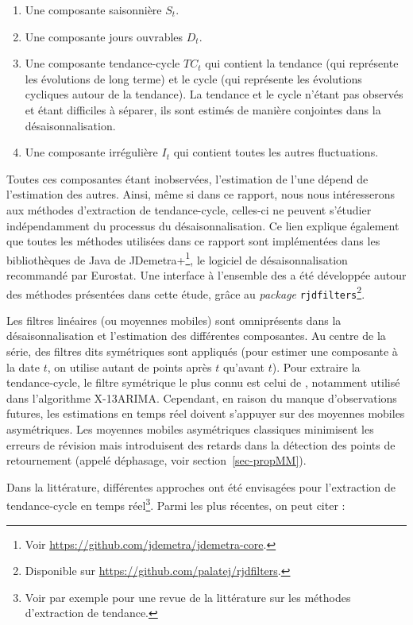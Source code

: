 \documentclass[
  12pt,
  french,
  12pt,a4paper]{article}
\newcommand\1{\mathds{1}}
\begin{document}
\begin{enumerate}
\def\labelenumi{\arabic{enumi}.}
\item
  Une composante saisonnière \(S_t\).
\item
  Une composante jours ouvrables \(D_t\).
\item
  Une composante tendance-cycle \(TC_t\) qui contient la tendance (qui représente les évolutions de long terme) et le cycle (qui représente les évolutions cycliques autour de la tendance).
  La tendance et le cycle n'étant pas observés et étant difficiles à séparer, ils sont estimés de manière conjointes dans la désaisonnalisation.
\item
  Une composante irrégulière \(I_t\) qui contient toutes les autres fluctuations.
\end{enumerate}

Toutes ces composantes étant inobservées, l'estimation de l'une dépend de l'estimation des autres.
Ainsi, même si dans ce rapport, nous nous intéresserons aux méthodes d'extraction de tendance-cycle, celles-ci ne peuvent s'étudier indépendamment du processus du désaisonnalisation.
Ce lien explique également que toutes les méthodes utilisées dans ce rapport sont implémentées dans les bibliothèques de Java de JDemetra+\footnote{Voir \url{https://github.com/jdemetra/jdemetra-core}.}, le logiciel de désaisonnalisation recommandé par Eurostat.
Une interface  à l'ensemble des a été développée autour des méthodes présentées dans cette étude, grâce au \emph{package} \texttt{rjdfilters}\footnote{Disponible sur \url{https://github.com/palatej/rjdfilters}.}.

Les filtres linéaires (ou moyennes mobiles) sont omniprésents dans la désaisonnalisation et l'estimation des différentes composantes.
Au centre de la série, des filtres dits symétriques sont appliqués (pour estimer une composante à la date \(t\), on utilise autant de points après \(t\) qu'avant \(t\)).
Pour extraire la tendance-cycle, le filtre symétrique le plus connu est celui de \textcite{henderson1916note}, notamment utilisé dans l'algorithme X-13ARIMA.
Cependant, en raison du manque d'observations futures, les estimations en temps réel doivent s'appuyer sur des moyennes mobiles asymétriques.
Les moyennes mobiles asymétriques classiques minimisent les erreurs de révision mais introduisent des retards dans la détection des points de retournement (appelé déphasage, voir section~\ref{sec-propMM}).

Dans la littérature, différentes approches ont été envisagées pour l'extraction de tendance-cycle en temps réel\footnote{Voir par exemple \textcite{alexandrov2012TEreview} pour une revue de la littérature sur les méthodes d'extraction de tendance.}.
Parmi les plus récentes, on peut citer :
\end{document}
